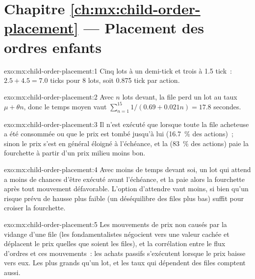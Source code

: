 \section*{Chapitre \ref{ch:mx:child-order-placement} --- Placement des ordres enfants}

\begin{solution}{exo:mx:child-order-placement:1}
Cinq lots à un demi-tick et trois à 1.5 tick~: $2.5+4.5=7.0$ ticks pour 8 lots, soit 0.875 tick par action.
\end{solution}

\begin{solution}{exo:mx:child-order-placement:2}
Avec $n$ lots devant, la file perd un lot au taux $\mu+\theta n$, donc le temps moyen vaut $\sum_{n=1}^{15}1/(0.69+0.021n)=17.8$ secondes.
\end{solution}

\begin{solution}{exo:mx:child-order-placement:3}
Il n'est exécuté que lorsque toute la file acheteuse a été consommée ou que le prix est tombé jusqu'à lui (16.7~\% des actions)~; sinon le prix s'est en général éloigné
à l'échéance, et la  (83~\% des actions) paie la fourchette à partir d'un prix milieu moins bon.
\end{solution}

\begin{solution}{exo:mx:child-order-placement:4}
Avec moins de temps devant soi, un lot qui attend a moins de chances d'être exécuté avant l'échéance, et la  paie alors la fourchette après tout mouvement défavorable.
L'option d'attendre vaut moins, si bien qu'un risque prévu de hausse plus faible (un déséquilibre des files plus bas) suffit pour croiser la fourchette.
\end{solution}

\begin{solution}{exo:mx:child-order-placement:5}
Les mouvements de prix non causés par la vidange d'une file (les fondamentalistes négocient vers une valeur cachée et déplacent le prix quelles que soient les files), et la
corrélation entre le flux d'ordres et ces mouvements~: les achats passifs s'exécutent lorsque le prix baisse vers eux. Les  plus grands qu'un lot, et les taux
qui dépendent des files comptent aussi.
\end{solution}

